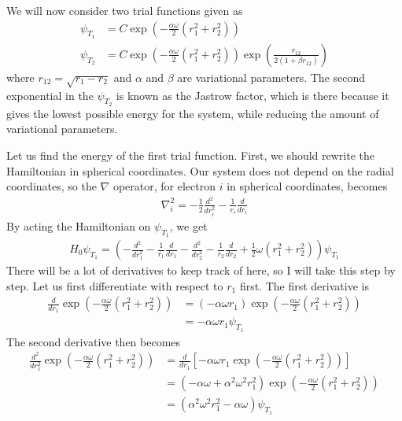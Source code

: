 \documentclass[12pt]{article}
\begin{document}

We will now consider two trial functions given as
\begin{align*}
\psi_{T_1} &= C \exp\left(-\frac{\alpha \omega}{2}(r^2_1 + r^2_2)\right) \\
\psi_{T_2} &= C \exp\left(-\frac{\alpha \omega}{2}(r^2_1 + r^2_2)\right)\exp\left(\frac{r_{12}}{2(1+\beta r_{12})}\right)
\end{align*}
where $r_{12} = \sqrt{r_1 - r_2}$ and $\alpha$ and $\beta$ are variational parameters. The second exponential in the $\psi_{T_2}$ is known as the Jastrow factor, which is there because it gives the lowest possible energy for the system, while reducing the amount of variational parameters.

Let us find the energy of the first trial function. First, we should rewrite the Hamiltonian in spherical coordinates. Our system does not depend on the radial coordinates, so the $\nabla$ operator, for electron $i$ in spherical coordinates, becomes
\begin{align*}
\nabla^2_i = -\frac{1}{2} \frac{d^2}{dr^2_i} - \frac{1}{r_i}\frac{d}{dr_i}
\end{align*}
By acting the Hamiltonian on $\psi_{T_1}$, we get
\begin{align*}
H_0\psi_{T_1} = \left(-\frac{d^2}{dr^2_1} - \frac{1}{r_1}\frac{d}{dr_1} -\frac{d^2}{dr^2_2} - \frac{1}{r_2}\frac{d}{dr_2} + \frac{1}{2}\omega(r_1^2+r_2^2)\right)\psi_{T_1}
\end{align*}
There will be a lot of derivatives to keep track of here, so I will take this step by step. Let us first differentiate with respect to $r_1$ first. The first derivative is
\begin{align*}
\frac{d}{dr_1}\exp\left(-\frac{\alpha \omega}{2}(r^2_1 + r^2_2)\right) &= \left( -\alpha \omega r_1 \right)\exp\left(-\frac{\alpha \omega}{2}(r^2_1 + r^2_2)\right) \\
&= -\alpha \omega r_1 \psi_{T_1}
\end{align*}
The second derivative then becomes
\begin{align*}
\frac{d^2}{dr_1^2}\exp\left(-\frac{\alpha \omega}{2}(r^2_1 + r^2_2)\right) &= \frac{d}{dr_1}\left[-\alpha \omega r_1 \exp\left(-\frac{\alpha \omega}{2}(r^2_1 + r^2_2)\right)\right]\\
&= (-\alpha \omega + \alpha^2 \omega^2 r_1^2)\exp\left(-\frac{\alpha \omega}{2}(r^2_1 + r^2_2)\right) \\
&= (\alpha^2 \omega^2 r_1^2 - \alpha \omega)\psi_{T_1}
\end{align*}
\end{document}
